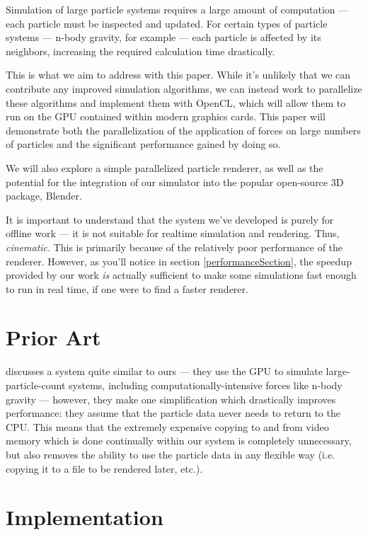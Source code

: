 \documentclass{acmsiggraph}
\begin{document}
Simulation of large particle systems requires a large amount of computation --- each particle must be inspected and updated. For certain types of particle systems --- n-body gravity, for example --- each particle is affected by its neighbors, increasing the required calculation time drastically.

This is what we aim to address with this paper. While it's unlikely that we can contribute any improved simulation algorithms, we can instead work to parallelize these algorithms and implement them with OpenCL, which will allow them to run on the GPU contained within modern graphics cards. This paper will demonstrate both the parallelization of the application of forces on large numbers of particles and the significant performance gained by doing so.

We will also explore a simple parallelized particle renderer, as well as the potential for the integration of our simulator into the popular open-source 3D package, Blender.

It is important to understand that the system we've developed is purely for offline work --- it is not suitable for realtime simulation and rendering. Thus, {\it cinematic}. This is primarily because of the relatively poor performance of the renderer. However, as you'll notice in section \ref{performanceSection}, the speedup provided by our work {\it is} actually sufficient to make some simulations fast enough to run in real time, if one were to find a faster renderer.

\section{Prior Art}

\cite{1281670} discusses a system quite similar to ours --- they use the GPU to simulate large-particle-count systems, including computationally-intensive forces like n-body gravity --- however, they make one simplification which drastically improves performance: they assume that the particle data never needs to return to the CPU. This means that the extremely expensive copying to and from video memory which is done continually within our system is completely unnecessary, but also removes the ability to use the particle data in any flexible way (i.e. copying it to a file to be rendered later, etc.).

\section{Implementation}
\end{document}
